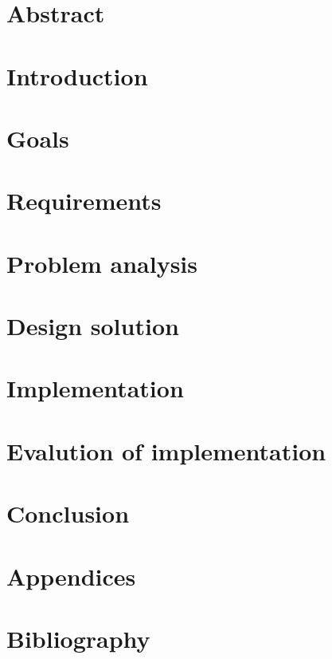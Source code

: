 \documentclass{article}
\begin{document}

\clearpage

\section*{Abstract}

\clearpage

\tableofcontents
\clearpage

\section{Introduction}

\clearpage

\section{Goals}

\clearpage

\section{Requirements}

\clearpage

\section{Problem analysis}

\clearpage

\section{Design solution}

\clearpage

\section{Implementation}

\clearpage

\section{Evalution of implementation}

\clearpage

\section{Conclusion}

\clearpage

\section{Appendices}

\clearpage

\section{Bibliography}

\clearpage
\end{document}
